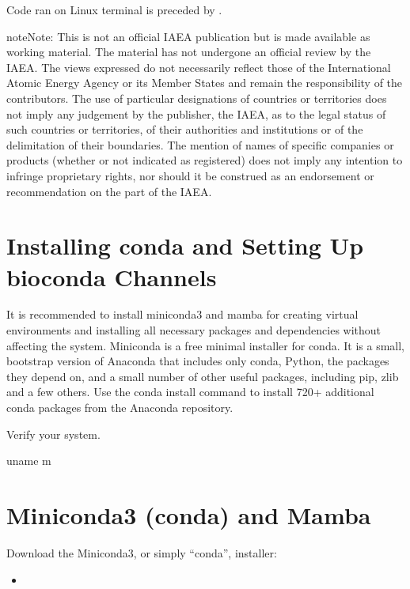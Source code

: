 \documentclass[letterpaper,10pt,english]{sphinxhowto}
\begin{document}
\sphinxAtStartPar
Code ran on Linux terminal is preceded by \sphinxcode{\sphinxupquote{\$}}.

\begin{sphinxadmonition}{note}{Note:}
\sphinxAtStartPar
This is not an official IAEA publication but is made available as working material. The material has not undergone an official review by the IAEA. The views expressed do not necessarily reflect those of the International Atomic Energy Agency or its Member States and remain the responsibility of the contributors. The use of particular designations of countries or territories does not imply any judgement by the publisher, the IAEA, as to the legal status of such countries or territories, of their authorities and institutions or of the delimitation of their boundaries. The mention of names of specific companies or products (whether or not indicated as registered) does not imply any intention to infringe proprietary rights, nor should it be construed as an endorsement or recommendation on the part of the IAEA.
\end{sphinxadmonition}


\section{Installing conda and Setting Up bioconda Channels}
\label{\detokenize{index:installing-conda-and-setting-up-bioconda-channels}}
\sphinxAtStartPar
It is recommended to install miniconda3 and mamba for creating virtual environments and installing all necessary packages and dependencies without affecting the system. Miniconda is a free minimal installer for conda. It is a small, bootstrap version of Anaconda that includes only conda, Python, the packages they depend on, and a small number of other useful packages, including pip, zlib and a few others. Use the conda install command to install 720+ additional conda packages from the Anaconda repository.

\sphinxAtStartPar
Verify your system.

\begin{sphinxVerbatim}[commandchars=\\\{\}]
\PYGZdl{} uname \PYGZhy{}m
\end{sphinxVerbatim}


\section{Miniconda3 (conda) and Mamba}
\label{\detokenize{index:miniconda3-conda-and-mamba}}
\sphinxAtStartPar
Download the Miniconda3, or simply “conda”, installer:
\begin{itemize}
\item {} 
\sphinxAtStartPar
{}

\end{itemize}
\end{document}
